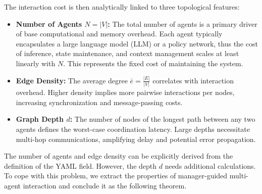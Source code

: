 \documentclass{article}
\theoremstyle{definition}
\begin{document}
The interaction cost is then analytically linked to three topological features:  
\begin{itemize}
\item \textbf{Number of Agents \( N = |V| \): }The total number of agents is a primary driver of base computational and memory overhead. Each agent typically encapsulates a large language model (LLM) or a policy network, thus the cost of inference, state maintenance, and context management scales at least linearly with \( N \). This represents the fixed cost of maintaining the system.
\item \textbf{Edge Density: }The average degree \( \bar{e} = \frac{|E|}{|V|} \) correlates with interaction overhead. Higher density implies more pairwise interactions per nodes, increasing synchronization and message-passing costs. 
\item \textbf{Graph Depth \( d \): }The number of nodes of the longest path between any two agents defines the worst-case coordination latency. Large depths necessitate multi-hop communications, amplifying delay and potential error propagation. 
\end{itemize}

The number of agents and edge density can be explicitly derived from the definition of the YAML field. However, the depth $d$ needs additional calculations. To cope with this problem, we extract the properties of manager-guided multi-agent interaction and conclude it as the following theorem.
\end{document}
